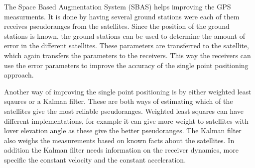 \documentclass{article}
\begin{document}
The Space Based Augmentation System (SBAS) helps improving the GPS measurments. It is done by having several ground stations were each of them receives pseudoranges from the satellites. Since the position of the ground stations is known, the ground stations can be used to determine the amount of error in the different satellites. These parameters are transferred to the satellite, which again transfers the parameters to the receivers. This way the receivers can use the error parameters to improve the accuracy of the single point positioning approach.

Another way of improving the single point positioning is by either weighted least sqaures or a Kalman filter. These are both ways of estimating which of the satellites give the most reliable pseudoranges. Weighted least squares can have different implementations, for example it can give more weight to satellites with lover elevation angle as these give the better pseudoranges. The Kalman filter also weighs the measurements based on known facts about the satellites. In addition the Kalman filter needs information on the receiver dynamics, more specific the constant velocity and the constant acceleration.
\end{document}

